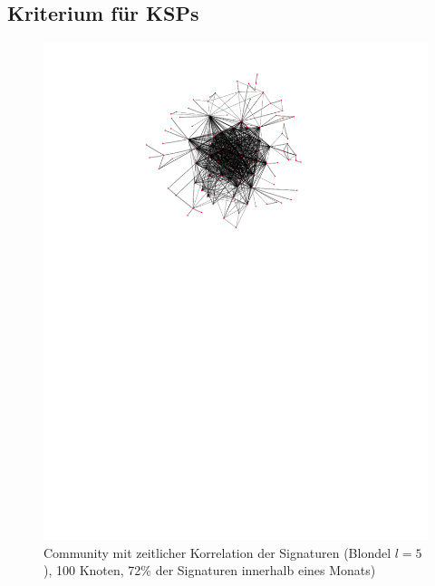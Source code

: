 \subsection{Kriterium für KSPs}
\label{sec:kriterium-fur-ksps}

\begin{figure}[th!]
  \centering
  \includegraphics[scale=1.5]{images/subgraph-label-time-fa62cc57cd35e9f90b85435efc407ad5.pdf}
  \caption{Community mit zeitlicher Korrelation der Signaturen
    (Blondel $l=5$),
    100 Knoten, 72\% der Signaturen innerhalb eines Monats)}
  \label{fig:time-corr-com-normal}
\end{figure}

